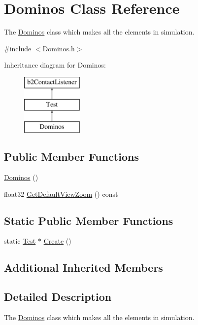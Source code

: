 \hypertarget{classDominos}{\section{Dominos Class Reference}
\label{classDominos}
}


The \hyperlink{classDominos}{Dominos} class which makes all the elements in simulation.  




{\ttfamily \#include $<$Dominos.\-h$>$}

Inheritance diagram for Dominos\-:\begin{figure}[H]
\begin{center}
\leavevmode
\includegraphics[height=3.000000cm]{classDominos}
\end{center}
\end{figure}
\subsection*{Public Member Functions}
\begin{DoxyCompactItemize}
\item 
\hyperlink{classDominos_a27b9b1be616966c37739fe92a38e4deb}{Dominos} ()
\item 
float32 \hyperlink{classDominos_aeb02333ccec47cebd34ec234200dd0c9}{Get\-Default\-View\-Zoom} () const 
\end{DoxyCompactItemize}
\subsection*{Static Public Member Functions}
\begin{DoxyCompactItemize}
\item 
static \hyperlink{classTest}{Test} $\ast$ \hyperlink{classDominos_a804c1c471f0eff8529a84948120f0d1a}{Create} ()
\end{DoxyCompactItemize}
\subsection*{Additional Inherited Members}


\subsection{Detailed Description}
The \hyperlink{classDominos}{Dominos} class which makes all the elements in simulation. 

